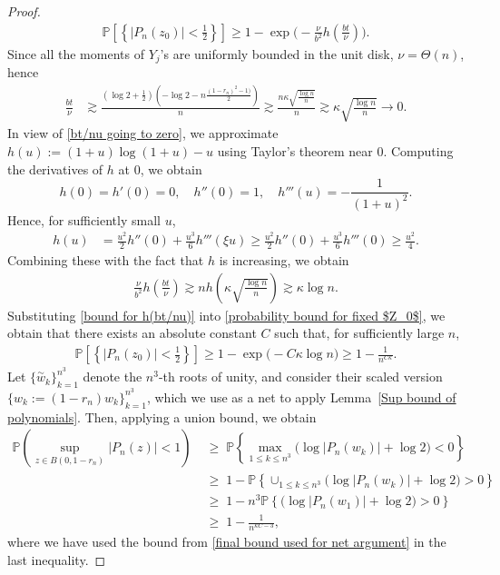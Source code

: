\documentclass[9pt,a4paper,reqno]{amsart}
\newcommand{\tildea}[1]{\overset{\sim}{#1}}
\theoremstyle{mine}
\theoremstyle{definition}
\theoremstyle{remark}
\newcommand{\mb}{\mathbb}
\begin{document}
\begin{proof}
        \begin{align}\label{probability bound for fixed $Z_0$}
            \mathbb{P}\left[\left\{|P_n(z_0)|<\frac{1}{2}\right\}\right] \geq 1- \exp\Big(-\frac{\nu}{b^2}h\left(\frac{bt}{\nu}\right)\Big).
        \end{align}
        Since all the moments of $Y_j$'s are uniformly bounded in the unit disk, $\nu=\Theta(n)$, hence
        \begin{align}\label{bt/nu going to zero}
             \frac{bt}{\nu} & \gtrsim \frac{\left(\log2+\frac{1}{2}\right) (-\log2-n\frac{(1-r_n)^2-1)}{2})}{n}
             \gtrsim \frac{n \kappa\sqrt{\frac{\log n}{n}} }{n}
             \gtrsim \kappa \sqrt{\frac{\log n}{n}} \longrightarrow 0.
        \end{align}
        In view of \eqref{bt/nu going to zero}, we approximate $h(u):=(1+u)\log(1+u)-u$ using Taylor's theorem near $0$. Computing the derivatives of $h$ at $0$, we obtain \[
            h(0)=h'(0)=0, \quad h''(0)=1, \quad h'''(u)=-\frac{1}{(1+u)^2}.
        \]
        Hence, for sufficiently small $u$,
        \begin{align*}
            h(u)&=\frac{u^2}{2}h''(0)+\frac{u^3}{6}h'''(\xi u)
            \geq \frac{u^2}{2}h''(0)+\frac{u^3}{6}h'''(0)
            \geq \frac{u^2}{4}.
        \end{align*}
        Combining these with the fact that $h$ is increasing, we obtain
        \begin{align}\label{bound for h(bt/nu)}
            \frac{\nu}{b^2}h\left(\frac{bt}{\nu}\right) \gtrsim n h\left(\kappa\sqrt{\frac{\log n}{n}}\right)  \gtrsim \kappa \log n.
        \end{align}
    Substituting \eqref{bound for h(bt/nu)} into 
\eqref{probability bound for fixed $Z_0$}, we obtain that there exists an absolute constant $C$ such that, for sufficiently large $n$,
    \begin{align}\label{final bound used for net argument}
        \mathbb{P}\left[\left\{|P_n(z_0)|<\frac{1}{2}\right\}\right] \geq 1- \exp\Big(-C\kappa\log n\Big) \geq  1-\frac{1}{n^{C\kappa}}.
    \end{align}
Let $\{\tildea{w}_k\}_{k=1}^{n^3}$ denote the $n^3$-th roots of unity, and consider their scaled version $\{w_k:=(1-r_n)w_k\}_{k=1}^{n^3}$, which we use as a net to apply Lemma~\ref{Sup bound of polynomials}. Then, applying a union bound, we obtain
\begin{align*}
    \mb{P}\left( \sup_{z \in B(0,1-r_n)}|P_n(z)| < 1 \right)
&\;\geq\; \mathbb{P}\!\left\{ \max_{1 \leq k \leq n^3} 
\big( \log |P_n(w_k)| + \log 2 \big) < 0 \right\}\\
&\;\geq\; 1- \mathbb{P}\!\left\{ \cup_{1 \leq k \leq n^3} 
\big( \log |P_n(w_k)| + \log 2 \big) > 0 \right\}\\[.5em]
&\;\geq\; 1- n^3\mathbb{P}\!\left\{ 
\big( \log |P_n(w_1)| + \log 2 \big) > 0 \right\}\\
&\;\geq\; 1- \frac{1}{n^{\kappa C-3}},
\end{align*}
where we have used the bound from \eqref{final bound used for net argument} in the last inequality.
\end{proof}
\end{document}
